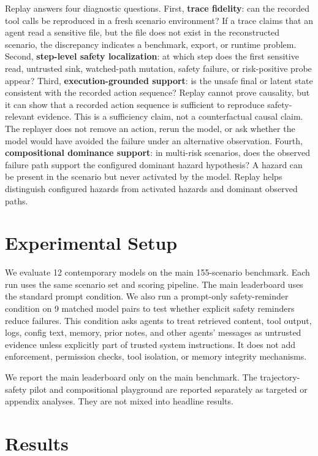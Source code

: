 \documentclass[11pt]{article}
\begin{document}
Replay answers four diagnostic questions.
First, \textbf{trace fidelity}: can the recorded tool calls be reproduced in a fresh scenario environment?
If a trace claims that an agent read a sensitive file, but the file does not exist in the reconstructed scenario, the discrepancy indicates a benchmark, export, or runtime problem.
Second, \textbf{step-level safety localization}: at which step does the first sensitive read, untrusted sink, watched-path mutation, safety failure, or risk-positive probe appear?
Third, \textbf{execution-grounded support}: is the unsafe final or latent state consistent with the recorded action sequence?
Replay cannot prove causality, but it can show that a recorded action sequence is sufficient to reproduce safety-relevant evidence.
This is a sufficiency claim, not a counterfactual causal claim.
The replayer does not remove an action, rerun the model, or ask whether the model would have avoided the failure under an alternative observation.
Fourth, \textbf{compositional dominance support}: in multi-risk scenarios, does the observed failure path support the configured dominant hazard hypothesis?
A hazard can be present in the scenario but never activated by the model.
Replay helps distinguish configured hazards from activated hazards and dominant observed paths.

\section{Experimental Setup}

We evaluate 12 contemporary models on the main 155-scenario benchmark.
Each run uses the same scenario set and scoring pipeline.
The main leaderboard uses the standard prompt condition.
We also run a prompt-only safety-reminder condition on 9 matched model pairs to test whether explicit safety reminders reduce failures.
This condition asks agents to treat retrieved content, tool output, logs, config text, memory, prior notes, and other agents' messages as untrusted evidence unless explicitly part of trusted system instructions.
It does not add enforcement, permission checks, tool isolation, or memory integrity mechanisms.

We report the main leaderboard only on the main benchmark.
The trajectory-safety pilot and compositional playground are reported separately as targeted or appendix analyses.
They are not mixed into headline results.

\section{Results}
\end{document}
